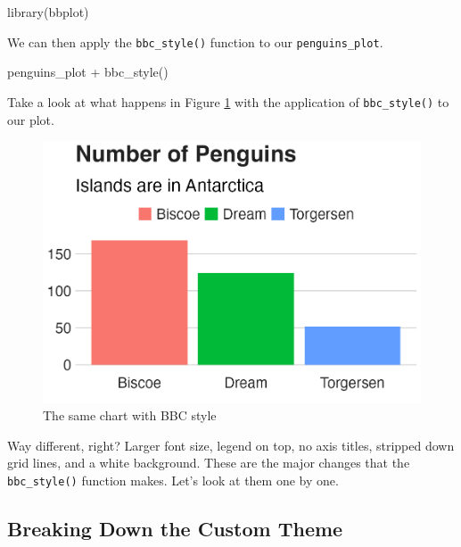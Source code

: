 \documentclass[
]{book}
\newenvironment{Shaded}{\begin{snugshade}}{\end{snugshade}}
\newcommand{\FunctionTok}[1]{\textcolor[rgb]{0.00,0.00,0.00}{#1}}
\newcommand{\NormalTok}[1]{#1}
\newcommand{\SpecialCharTok}[1]{\textcolor[rgb]{0.00,0.00,0.00}{#1}}
\begin{document}
\begin{Shaded}
\begin{Highlighting}[]
\FunctionTok{library}\NormalTok{(bbplot)}
\end{Highlighting}
\end{Shaded}

We can then apply the \texttt{bbc\_style()} function to our \texttt{penguins\_plot}.

\begin{Shaded}
\begin{Highlighting}[]
\NormalTok{penguins\_plot }\SpecialCharTok{+}
  \FunctionTok{bbc\_style}\NormalTok{()}
\end{Highlighting}
\end{Shaded}

Take a look at what happens in Figure \ref{fig:penguins-bbc-style-plot} with the application of \texttt{bbc\_style()} to our plot.

\begin{figure}
\includegraphics[width=1\linewidth]{custom-theme_files/figure-latex/penguins-bbc-style-plot-1} \caption{The same chart with BBC style}\label{fig:penguins-bbc-style-plot}
\end{figure}

Way different, right? Larger font size, legend on top, no axis titles, stripped down grid lines, and a white background. These are the major changes that the \texttt{bbc\_style()} function makes. Let's look at them one by one.

\hypertarget{breaking-down-the-custom-theme}{%
\subsection*{Breaking Down the Custom Theme}\label{breaking-down-the-custom-theme}}
\end{document}
